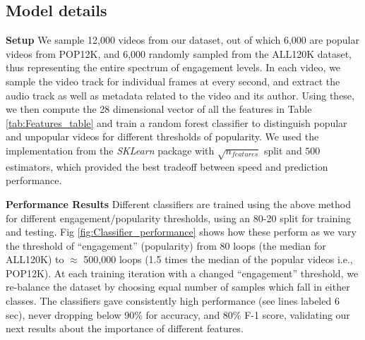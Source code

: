 \subsection{Model details}
\label{sec:model-details}
\noindent\textbf{Setup}
We sample 12,000 videos from our dataset, out of which 6,000 are popular videos from  POP12K, and 6,000 randomly sampled from the ALL120K dataset, thus representing the entire spectrum of engagement levels. In each video, we sample the video track for individual frames at every second, and extract the audio track as well as metadata related to the video and its author. Using these, we then compute the 28 dimensional vector of all the features in Table \ref{tab:Features_table} and train a random forest classifier to distinguish popular and unpopular videos for different thresholds of popularity. We used the implementation from the \emph{SKLearn} package with $\sqrt{n_{features}}$ split and $500$ estimators, which provided the best tradeoff between speed and prediction performance.
 
\noindent\textbf{Performance Results} 
Different classifiers are trained using the above method for different engagement/popularity thresholds, using an 80-20 split for training and testing. Fig \ref{fig:Classifier_performance} shows how these perform as we vary the threshold of ``engagement'' (popularity) from 80 loops (the median for ALL120K) to  $\approx$ 500,000 loops (1.5 times the median of the popular videos i.e., POP12K). At each training iteration with a changed ``engagement'' threshold, we re-balance the dataset by choosing equal number of samples which fall in either classes. The classifiers gave consistently high performance (see lines labeled 6 sec), never dropping below 90\% for accuracy, and 80\% F-1 score, validating our next results about the importance of different features. 

